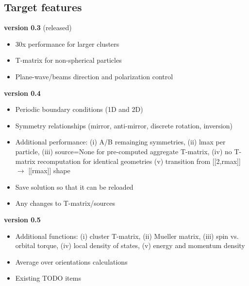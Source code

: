 \documentclass[11pt]{article}
\begin{document}
\subsection{Target features}

\begin{enumerate*}
    \item \textbf{version 0.3} (released)
        \begin{itemize}[label={\tiny\raisebox{1ex}{\textbullet}}]
            \item 30x performance for larger clusters
            \item T-matrix for non-spherical particles
            \item Plane-wave/beams direction and polarization control
        \end{itemize}
    \item \textbf{version 0.4}
        \begin{itemize}[label={\tiny\raisebox{1ex}{\textbullet}}]
            \item Periodic boundary conditions (1D and 2D)
            \item Symmetry relationships (mirror, anti-mirror, discrete rotation, inversion)
            \item Additional performance: 
                        (i) A/B remainging symmetries, 
                        (ii) lmax per particle,
                        (iii) source=None for pre-computed aggregate T-matrix,
                        (iv) no T-matrix recomputation for identical geometries
                        (v) transition from [[2,rmax]] $\rightarrow$ [[rmax]] shape
                    \item Save solution so that it can be reloaded
            \item Any changes to T-matrix/sources
        \end{itemize}
    \item \textbf{version 0.5}
        \begin{itemize}[label={\tiny\raisebox{1ex}{\textbullet}}]
            \item Additional functions: 
                       (i) cluster T-matrix,
                       (ii) Mueller matrix,
                       (iii) spin vs. orbital torque,
                       (iv) local density of states,
                       (v) energy and momentum density
            \item Average over orientations calculations
            \item Existing TODO items

\end{itemize}
\end{enumerate*}
\end{document}
